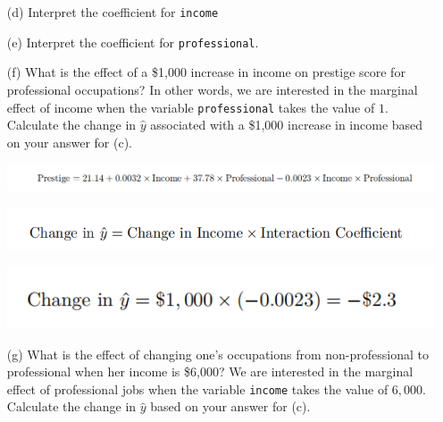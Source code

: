 \documentclass[12pt,letterpaper]{article}
\begin{document}
\begin{enumerate}
	\item [(d)]
	Interpret the coefficient for \texttt{income}
	\vspace{1cm}
	 
	\vspace{1cm}	
	\item [(e)]
	Interpret the coefficient for \texttt{professional}.
	 
	\newpage
	
	\item [(f)]
	What is the effect of a \$1,000 increase in income on prestige score for professional occupations? In other words, we are interested in the marginal effect of income when the variable \texttt{professional} takes the value of $1$. Calculate the change in $\hat{y}$ associated with a \$1,000 increase in income based on your answer for (c).
	 
	\centering 
	\includegraphics[width=0.9\linewidth]{q4}
	 
	\centering 
	\includegraphics[width=0.9\linewidth]{q5}
	 
	\centering 
	\includegraphics[width=0.6\linewidth]{q6}\\
	 
	\newpage
	
	
	\item [(g)]
	What is the effect of changing one's occupations from non-professional to professional when her income is \$6,000? We are interested in the marginal effect of professional jobs when the variable \texttt{income} takes the value of $6,000$. Calculate the change in $\hat{y}$ based on your answer for (c).
	

\end{enumerate}
\end{document}
